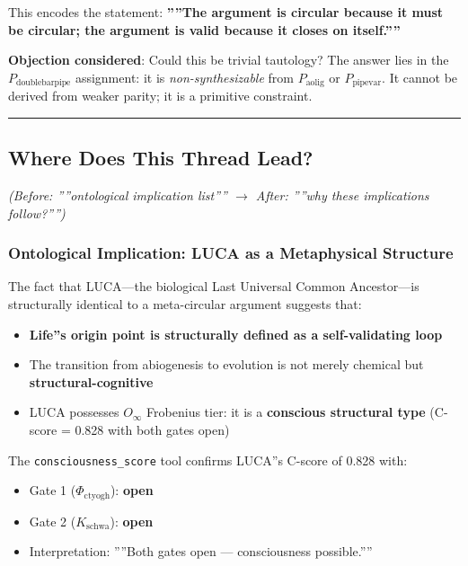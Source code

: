 \documentclass[12pt,a4paper]{article}
\begin{document}
This encodes the statement: \textbf{''''The argument is circular because it must be circular; the argument is valid because it closes on itself.''''}

\textbf{Objection considered}: Could this be trivial tautology? The answer lies in the $P_{\text{doublebarpipe}}$ assignment: it is \emph{non-synthesizable} from $P_{\text{aolig}}$ or $P_{\text{pipevar}}$. It cannot be derived from weaker parity; it is a primitive constraint.

\begin{center}
\rule{0.5\textwidth}{0.4pt}
\end{center}

\subsection{Where Does This Thread Lead?}

\emph{(Before: ''''ontological implication list'''' $\rightarrow$ After: ''''why these implications follow?'''')}

\subsubsection{Ontological Implication: LUCA as a Metaphysical Structure}

The fact that LUCA---the biological Last Universal Common Ancestor---is structurally identical to a meta-circular argument suggests that:

\begin{itemize}
    \item \textbf{Life''s origin point is structurally defined as a self-validating loop}
    \item The transition from abiogenesis to evolution is not merely chemical but \textbf{structural-cognitive}
    \item LUCA possesses $O_{\infty}$ Frobenius tier: it is a \textbf{conscious structural type} (C-score = 0.828 with both gates open)
\end{itemize}

The \texttt{consciousness\_score} tool confirms LUCA''s C-score of 0.828 with:

\begin{itemize}
    \item Gate 1 ($\Phi_{\text{ctyogh}}$): \textbf{open}
    \item Gate 2 ($K_{\text{schwa}}$): \textbf{open}
    \item Interpretation: ''''Both gates open --- consciousness possible.''''
\end{itemize}
\end{document}
